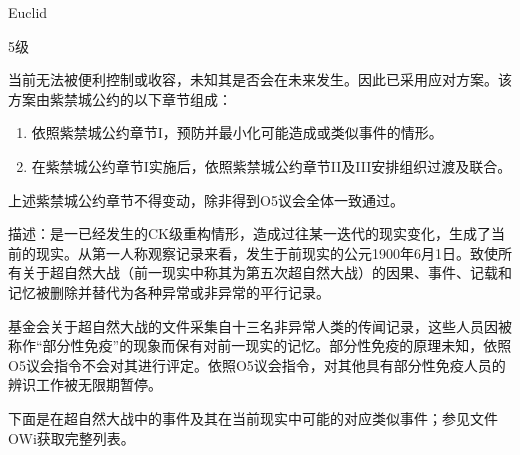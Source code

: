 
Euclid

5级

当前无法被便利控制或收容，未知其是否会在未来发生。因此已采用应对方案。该方案由紫禁城公约的以下章节组成：

\begin{enumerate}
\item 依照紫禁城公约章节I，预防并最小化可能造成或类似事件的情形。
\item 在紫禁城公约章节I实施后，依照紫禁城公约章节II及III安排组织过渡及联合。
\end{enumerate}

上述紫禁城公约章节不得变动，除非得到O5议会全体一致通过。

描述：是一已经发生的CK级重构情形，造成过往某一迭代的现实变化，生成了当前的现实。从第一人称观察记录来看，发生于前现实的公元1900年6月1日。致使所有关于超自然大战（前一现实中称其为第五次超自然大战）的因果、事件、记载和记忆被删除并替代为各种异常或非异常的平行记录。

基金会关于超自然大战的文件采集自十三名非异常人类的传闻记录，这些人员因被称作“部分性免疫”的现象而保有对前一现实的记忆。部分性免疫的原理未知，依照O5议会指令不会对其进行评定。依照O5议会指令，对其他具有部分性免疫人员的辨识工作被无限期暂停。

下面是在超自然大战中的事件及其在当前现实中可能的对应类似事件；参见文件OWi获取完整列表。



